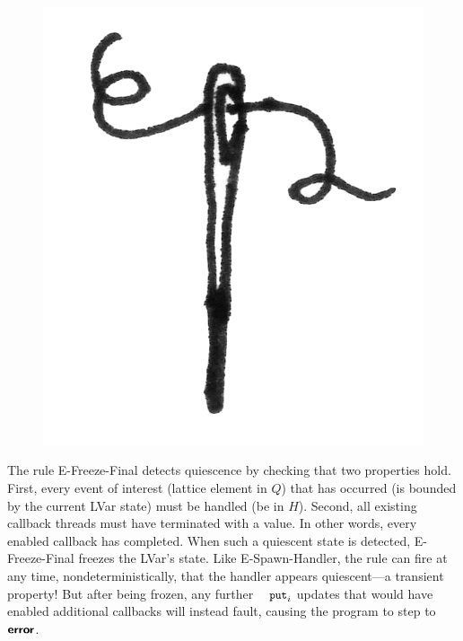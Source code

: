 \ifdefined\DISSERTATION
\begin{figure}
\vspace{-1.5em}
\begin{center}
  \includegraphics[scale=0.15]{../illustrations/thread}
\end{center}
\vspace{-1em}
\end{figure}
\fi

The rule {\sc E-Freeze-Final} detects quiescence by checking that two
properties hold.  First, every event of interest (lattice element in
$Q$) that has occurred (is bounded by the current LVar state) must be
handled (be in $H$).  Second, all existing callback threads must have
terminated with a value.  In other words, every enabled callback has
completed.  When such a quiescent state is detected, {\sc
  E-Freeze-Final} freezes the LVar's state.  Like {\sc
  E-Spawn-Handler}, the rule can fire at any time,
nondeterministically, that the handler appears quiescent---a transient
property!  But after being frozen, any further $\PUTi$ updates that
would have enabled additional callbacks will instead fault, causing
the program to step to $\textbf{\textsf{error}}$.

